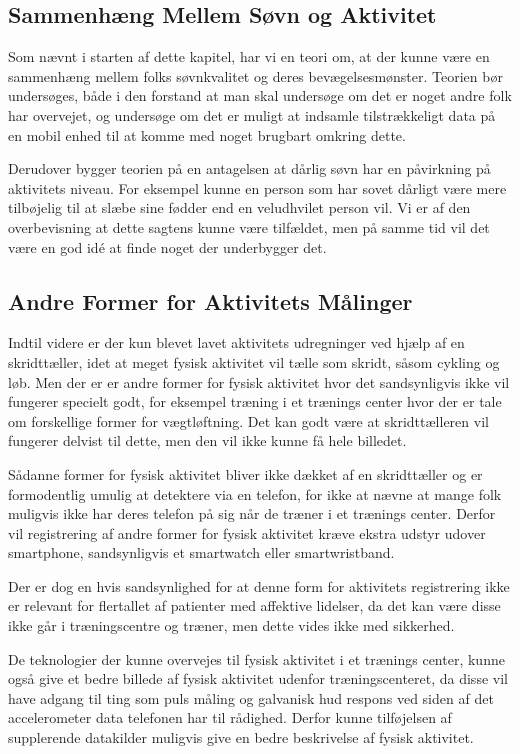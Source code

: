 \subsection{Sammenhæng Mellem Søvn og Aktivitet}
Som nævnt i starten af dette kapitel, har vi en teori om, at der kunne være en sammenhæng mellem folks søvnkvalitet og deres bevægelsesmønster.
Teorien bør undersøges, både i den forstand at man skal undersøge om det er noget andre folk har overvejet, og undersøge om det er muligt at indsamle tilstrækkeligt data på en mobil enhed til at komme med noget brugbart omkring dette.

Derudover bygger teorien på en antagelsen at dårlig søvn har en påvirkning på aktivitets niveau.
For eksempel kunne en person som har sovet dårligt være mere tilbøjelig til at slæbe sine fødder end en veludhvilet person vil.
Vi er af den overbevisning at dette sagtens kunne være tilfældet, men på samme tid vil det være en god idé at finde noget der underbygger det.

\subsection{Andre Former for Aktivitets Målinger}
Indtil videre er der kun blevet lavet aktivitets udregninger ved hjælp af en skridttæller, idet at meget fysisk aktivitet vil tælle som skridt, såsom cykling og løb. 
Men der er er andre former for fysisk aktivitet hvor det sandsynligvis ikke vil fungerer specielt godt, for eksempel træning i et trænings center hvor der er tale om forskellige former for vægtløftning. 
Det kan godt være at skridttælleren vil fungerer delvist til dette, men den vil ikke kunne få hele billedet.

Sådanne former for fysisk aktivitet bliver ikke dækket af en skridttæller og er formodentlig umulig at detektere via en telefon, for ikke at nævne at mange folk muligvis ikke har deres telefon på sig når de træner i et trænings center.
Derfor vil registrering af andre former for fysisk aktivitet kræve ekstra udstyr udover smartphone, sandsynligvis et smartwatch eller smartwristband.

Der er dog en hvis sandsynlighed for at denne form for aktivitets registrering ikke er relevant for flertallet af patienter med affektive lidelser, da det kan være disse ikke går i træningscentre og træner, men dette vides ikke med sikkerhed.

De teknologier der kunne overvejes til fysisk aktivitet i et trænings center, kunne også give et bedre billede af fysisk aktivitet udenfor træningscenteret, da disse vil have adgang til ting som puls måling og galvanisk hud respons ved siden af det accelerometer data telefonen har til rådighed.
Derfor kunne tilføjelsen af supplerende datakilder muligvis give en bedre beskrivelse af fysisk aktivitet.